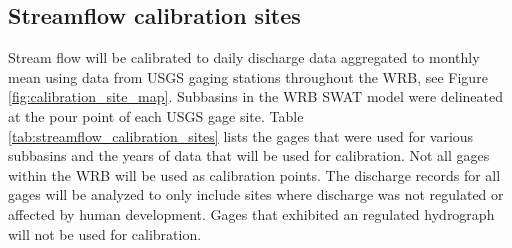 \subsection{Streamflow calibration sites}\label{sec:streamflow_calibration_sites}

Stream flow will be calibrated to daily discharge data aggregated to monthly mean using data from USGS gaging stations throughout the WRB, see Figure \ref{fig:calibration_site_map}. 
Subbasins in the WRB SWAT model were delineated at the pour point of each USGS gage site. 
Table \ref{tab:streamflow_calibration_sites} lists the gages that were used for various subbasins and the years of data that will be used for calibration. Not all gages within the WRB will be used as calibration points. 
The discharge records for all gages will be analyzed to only include sites where discharge was not regulated or affected by human development.
 Gages that exhibited an regulated hydrograph will not be used for calibration.

